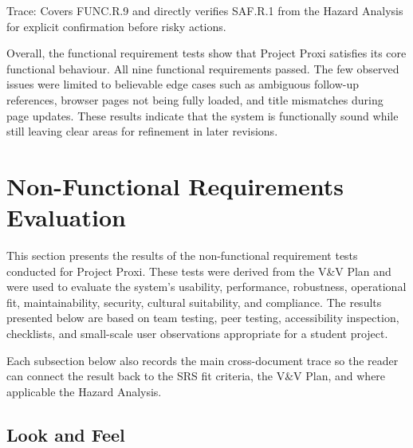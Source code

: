 \documentclass[12pt]{article}
\begin{document}
\noindent Trace: Covers FUNC.R.9 and directly verifies SAF.R.1 from the Hazard
Analysis for explicit confirmation before risky actions.


Overall, the functional requirement tests show that Project Proxi
satisfies its core functional behaviour. All nine functional
requirements passed. The few observed issues were limited to
believable edge cases such as ambiguous follow-up references, browser
pages not being fully loaded, and title mismatches during page
updates. These results indicate that the system is functionally sound
while still leaving clear areas for refinement in later revisions.

\section{Non-Functional Requirements Evaluation}

\noindent This section presents the results of the non-functional requirement
tests conducted for Project Proxi. These tests were derived from the
V\&V Plan and were used to evaluate the system's usability,
performance, robustness, operational fit, maintainability, security,
cultural suitability, and compliance. The results presented below are
based on team testing, peer testing, accessibility inspection,
checklists, and small-scale user observations appropriate for a
student project.

Each subsection below also records the main cross-document trace so the
reader can connect the result back to the SRS fit criteria, the V\&V Plan,
and where applicable the Hazard Analysis.

\subsection{Look and Feel}
\end{document}

